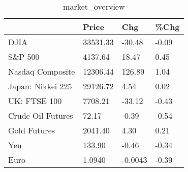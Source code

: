\documentclass{article}%
\begin{document}
%


\begin{table}[htbp]%
\caption{market\_overview}%
\centering%
\begin{adjustbox}{width=1\textwidth}%
\begin{tabular}{llll}
\toprule
                  &    Price &     Chg &  \%Chg \\
\midrule
             DJIA & 33531.33 &  -30.48 & -0.09 \\
          S\&P 500 &  4137.64 &   18.47 &  0.45 \\
 Nasdaq Composite & 12306.44 &  126.89 &  1.04 \\
Japan: Nikkei 225 & 29126.72 &    4.54 &  0.02 \\
     UK: FTSE 100 &  7708.21 &  -33.12 & -0.43 \\
Crude Oil Futures &    72.17 &   -0.39 & -0.54 \\
     Gold Futures &  2041.40 &    4.30 &  0.21 \\
              Yen &   133.90 &   -0.46 & -0.34 \\
             Euro &   1.0940 & -0.0043 & -0.39 \\
\bottomrule
\end{tabular}
%
\end{adjustbox}%
\end{table}

%
\end{document}
